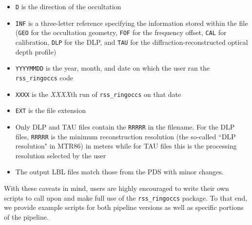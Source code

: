 \documentclass[titlepage, 12pt]{article}
\begin{document}
\begin{itemize}
\begin{itemize}
                          \item \texttt{D} is the direction of the
                                occultation
                          \item \texttt{INF} is a three-letter reference
                                specifying the information stored within
                                the file (\texttt{GEO} for the
                                occultation geometry,
                                \texttt{FOF} for the frequency offset,
                                \texttt{CAL} for calibration, \texttt{DLP}
                                for the DLP, and \texttt{TAU} for the
                                diffraction-reconstructed optical depth
                                profile)
                          \item \texttt{YYYYMMDD} is the year, month,
                                and date on which the user ran the
                                \texttt{rss\_ringoccs} code
                          \item \texttt{XXXX} is the \textit{XXXX}th
                                run of \texttt{rss\_ringoccs}
                                on that date
                          \item \texttt{EXT} is the file extension
                          \item Only DLP and TAU files contain the
                                \texttt{RRRRR} in the filename.
                                For the DLP
                                files, \texttt{RRRRR} is the minimum
                                reconstruction resolution (the so-called
                                ``DLP resolution" in MTR86)
                                in meters while
                                for TAU files this is the processing
                                resolution selected by the user
                          \item The output LBL files match those from
                                the PDS with minor changes.
                      \end{itemize}
            \end{itemize}
            With these caveats in mind, users are highly encouraged
            to write their own scripts to call upon and make full
            use of the \texttt{rss\_ringoccs} package. To that end,
            we provide example scripts for both pipeline versions
            as well as specific portions of the pipeline.
\end{document}
